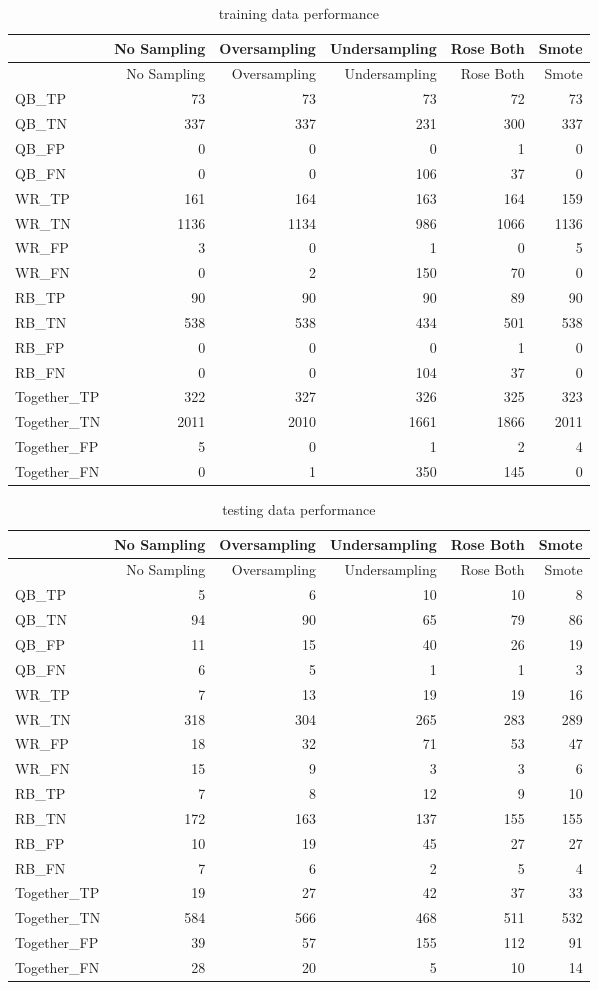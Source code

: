 \documentclass[]{article}
\begin{document}
\begin{longtable}[]{@{}lrrrrr@{}}
\caption{training data performance}\tabularnewline
\toprule
& No Sampling & Oversampling & Undersampling & Rose Both &
Smote\tabularnewline
\midrule
\endfirsthead
\toprule
& No Sampling & Oversampling & Undersampling & Rose Both &
Smote\tabularnewline
\midrule
\endhead
QB\_TP & 73 & 73 & 73 & 72 & 73\tabularnewline
QB\_TN & 337 & 337 & 231 & 300 & 337\tabularnewline
QB\_FP & 0 & 0 & 0 & 1 & 0\tabularnewline
QB\_FN & 0 & 0 & 106 & 37 & 0\tabularnewline
WR\_TP & 161 & 164 & 163 & 164 & 159\tabularnewline
WR\_TN & 1136 & 1134 & 986 & 1066 & 1136\tabularnewline
WR\_FP & 3 & 0 & 1 & 0 & 5\tabularnewline
WR\_FN & 0 & 2 & 150 & 70 & 0\tabularnewline
RB\_TP & 90 & 90 & 90 & 89 & 90\tabularnewline
RB\_TN & 538 & 538 & 434 & 501 & 538\tabularnewline
RB\_FP & 0 & 0 & 0 & 1 & 0\tabularnewline
RB\_FN & 0 & 0 & 104 & 37 & 0\tabularnewline
Together\_TP & 322 & 327 & 326 & 325 & 323\tabularnewline
Together\_TN & 2011 & 2010 & 1661 & 1866 & 2011\tabularnewline
Together\_FP & 5 & 0 & 1 & 2 & 4\tabularnewline
Together\_FN & 0 & 1 & 350 & 145 & 0\tabularnewline
\bottomrule
\end{longtable}

\begin{longtable}[]{@{}lrrrrr@{}}
\caption{testing data performance}\tabularnewline
\toprule
& No Sampling & Oversampling & Undersampling & Rose Both &
Smote\tabularnewline
\midrule
\endfirsthead
\toprule
& No Sampling & Oversampling & Undersampling & Rose Both &
Smote\tabularnewline
\midrule
\endhead
QB\_TP & 5 & 6 & 10 & 10 & 8\tabularnewline
QB\_TN & 94 & 90 & 65 & 79 & 86\tabularnewline
QB\_FP & 11 & 15 & 40 & 26 & 19\tabularnewline
QB\_FN & 6 & 5 & 1 & 1 & 3\tabularnewline
WR\_TP & 7 & 13 & 19 & 19 & 16\tabularnewline
WR\_TN & 318 & 304 & 265 & 283 & 289\tabularnewline
WR\_FP & 18 & 32 & 71 & 53 & 47\tabularnewline
WR\_FN & 15 & 9 & 3 & 3 & 6\tabularnewline
RB\_TP & 7 & 8 & 12 & 9 & 10\tabularnewline
RB\_TN & 172 & 163 & 137 & 155 & 155\tabularnewline
RB\_FP & 10 & 19 & 45 & 27 & 27\tabularnewline
RB\_FN & 7 & 6 & 2 & 5 & 4\tabularnewline
Together\_TP & 19 & 27 & 42 & 37 & 33\tabularnewline
Together\_TN & 584 & 566 & 468 & 511 & 532\tabularnewline
Together\_FP & 39 & 57 & 155 & 112 & 91\tabularnewline
Together\_FN & 28 & 20 & 5 & 10 & 14\tabularnewline
\bottomrule
\end{longtable}
\end{document}
